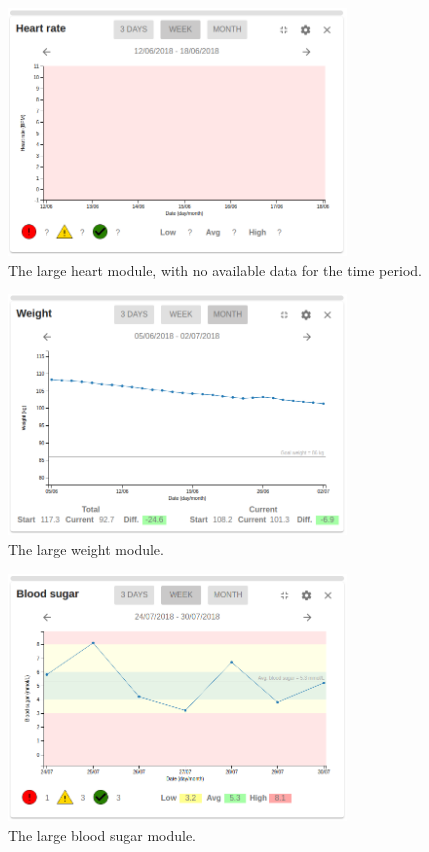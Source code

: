     \begin{figure}[!htb]
        \centering
        \includegraphics[width=0.8\textwidth]{screenshots/hr_large}
        \caption{The large heart module, with no available data for the time period.}\label{fig:screen_hr_large}
    \end{figure}

    \begin{figure}[!htb]
        \centering
        \includegraphics[width=0.8\textwidth]{screenshots/weight_large}
        \caption{The large weight module.}\label{fig:screen_weight_large}
    \end{figure}

    \begin{figure}[!htb]
        \centering
        \includegraphics[width=0.8\textwidth]{screenshots/bs_large}
        \caption{The large blood sugar module.}\label{fig:screen_bs_large}
    \end{figure}

